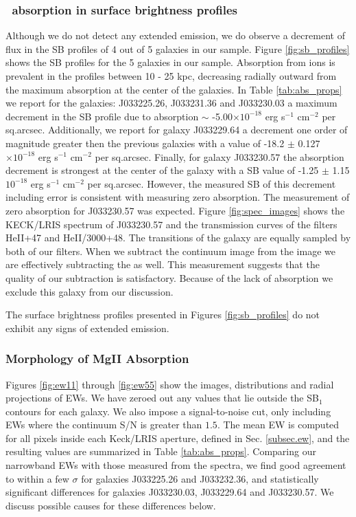 \documentclass[twocolumn]{aastex61}
\begin{document}
\subsubsection{\ absorption in surface brightness profiles}
Although we do not detect any extended  emission, we do observe a decrement of flux in the SB profiles of 4 out of 5 galaxies in our sample. Figure \ref{fig:sb_profiles} shows the SB profiles for the 5 galaxies in our sample. Absorption from  ions is prevalent in the profiles between 10 - 25 kpc, decreasing radially outward from the maximum absorption at the center of the galaxies. In Table \ref{tab:abs_props} we report for the galaxies: J033225.26, J033231.36 and J033230.03 a maximum decrement in the SB profile due to absorption $\sim$ -5.00$\times10^{-18}$ erg s$^{-1}$ cm$^{-2}$ per sq.arcsec. Additionally, we report for galaxy J033229.64 a decrement one order of magnitude greater then the previous galaxies with a value of -18.2 $\pm$ 0.127 $\times10^{-18}$ erg s$^{-1}$ cm$^{-2}$ per sq.arcsec. Finally, for galaxy J033230.57 the absorption decrement is strongest at the center of the galaxy with a SB value of -1.25 $\pm$ 1.15 $10^{-18}$ erg s$^{-1}$ cm$^{-2}$ per sq.arcsec. However, the measured SB of this decrement including error is consistent with measuring zero absorption. The measurement of zero absorption for J033230.57 was expected. Figure \ref{fig:spec_images} shows the KECK/LRIS spectrum of J033230.57 and the transmission curves of the filters HeII+47 and HeII/3000+48. The  transitions of the galaxy are equally sampled by both of our filters. When we subtract the continuum image from the  image we are effectively subtracting the  as well. This measurement suggests that the quality of our subtraction is satisfactory. Because of the lack of absorption we exclude this galaxy from our discussion.

The surface brightness profiles presented in Figures \ref{fig:sb_profiles} do not exhibit any signs of extended  emission.

\subsubsection{Morphology of MgII Absorption}
Figures \ref{fig:ew11} through \ref{fig:ew55} show the images, distributions and radial projections of  EWs. We have zeroed out any values that lie outside the SB$_1$ contours for each galaxy. We also impose a signal-to-noise cut, only including EWs where the continuum S/N is greater than $1.5$. The mean EW is computed for all pixels inside each Keck/LRIS aperture, defined in Sec. \ref{subsec.ew}, and the resulting values are summarized in Table \ref{tab:abs_props}. Comparing our narrowband EWs with those measured from the spectra, we find good agreement to within a few $\sigma$ for galaxies J033225.26 and J033232.36, and statistically significant differences for galaxies J033230.03, J033229.64 and J033230.57. We discuss possible causes for these differences below.
\end{document}

